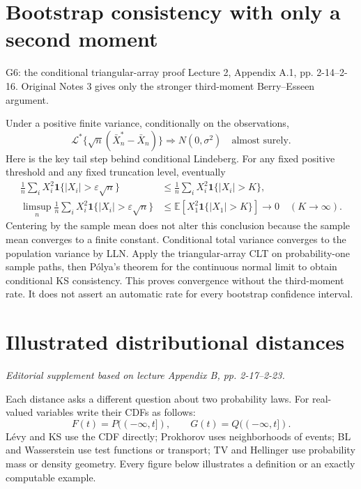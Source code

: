 \documentclass[12pt]{article}
\newcommand{\E}{\mathbb E}
\begin{document}
\section{Bootstrap consistency with only a second moment}
\begin{gapbox}{G6: the conditional triangular-array proof}
Lecture 2, Appendix A.1, pp. 2-14--2-16. Original Notes 3 gives only
the stronger third-moment Berry--Esseen argument.
\end{gapbox}
Under a positive finite variance, conditionally on the observations,
\begin{equation}
 \mathcal L^*\{\sqrt n(\bar X_n^*-\bar X_n)\}
 \Rightarrow N(0,\sigma^2)\quad\text{almost surely}.
\end{equation}
Here is the key tail step behind conditional Lindeberg. For any fixed
positive threshold and any fixed truncation level, eventually
\begin{align}
 \frac1n\sum_i X_i^2\mathbf1\{|X_i|>\varepsilon\sqrt n\}
 &\le\frac1n\sum_i X_i^2\mathbf1\{|X_i|>K\},\\
 \limsup_n\frac1n\sum_i X_i^2\mathbf1\{|X_i|>\varepsilon\sqrt n\}
 &\le\E[X_1^2\mathbf1\{|X_1|>K\}]\longrightarrow0
 \quad(K\to\infty).
\end{align}
Centering by the sample mean does not alter this conclusion because the
sample mean converges to a finite constant. Conditional total variance
converges to the population variance by LLN. Apply the triangular-array
CLT on probability-one sample paths, then P\'olya's theorem for the
continuous normal limit to obtain conditional KS consistency. This proves
convergence without the third-moment rate. It does not assert an automatic
rate for every bootstrap confidence interval.

\clearpage
\appendix
\section{Illustrated distributional distances}\label{sec:atlas}
\textit{Editorial supplement based on lecture Appendix B, pp. 2-17--2-23.}

Each distance asks a different question about two probability laws. For
real-valued variables write their CDFs as follows:
\begin{equation}
 F(t)=P(({-\infty},t]),\qquad G(t)=Q(({-\infty},t]).
\end{equation}
L\'evy and KS use the CDF directly; Prokhorov uses neighborhoods of events;
BL and Wasserstein use test functions or transport; TV and Hellinger use
probability mass or density geometry. Every figure below illustrates a
definition or an exactly computable example.
\end{document}
